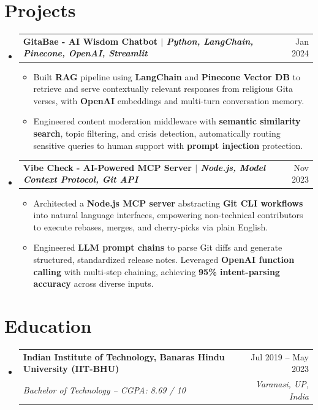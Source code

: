 \documentclass[a4paper,10pt]{article}
\makeatletter
\newcommand{\resumeItem}[1]{
  \item\small{
    {#1 \vspace{-1.8pt}}
  }
}
\newcommand{\resumeEducationEntry}[4]{
  \vspace{2pt}\item
    \begin{tabular*}{0.98\textwidth}[t]{l@{\extracolsep{\fill}}r}
      \textbf{#1} & \small #3 \\
      \textit{\small #2} & \textit{\small #4} \\
    \end{tabular*}\vspace{-4pt}
}
\newcommand{\resumeProjectHeading}[2]{
    \item
    \begin{tabular*}{0.98\textwidth}{l@{\extracolsep{\fill}}r}
      \small\textbf{#1} & \small #2 \\
    \end{tabular*}\vspace{-4pt}
}
\newcommand{\resumeSubHeadingListStart}{
  \begin{itemize}[leftmargin=0.15in, label={}, topsep=2pt, partopsep=0pt, itemsep=4pt, parsep=0pt]
}
\newcommand{\resumeSubHeadingListEnd}{\end{itemize}}
\newcommand{\resumeItemListStart}{\begin{itemize}[topsep=2pt, partopsep=0pt, itemsep=1.5pt, parsep=0pt]}
\newcommand{\resumeItemListEnd}{\end{itemize}\vspace{-2pt}}
\makeatother
\begin{document}
\section{Projects}
\resumeSubHeadingListStart
  \resumeProjectHeading{\textbf{GitaBae - AI Wisdom Chatbot} $|$ \textit{Python, LangChain, Pinecone, OpenAI, Streamlit}}{Jan 2024}
  \resumeItemListStart
    \resumeItem{Built \textbf{RAG} pipeline using \textbf{LangChain} and \textbf{Pinecone Vector DB} to retrieve and serve contextually relevant responses from religious Gita verses, with \textbf{OpenAI} embeddings and multi-turn conversation memory.}
    \resumeItem{Engineered content moderation middleware with \textbf{semantic similarity search}, topic filtering, and crisis detection, automatically routing sensitive queries to human support with \textbf{prompt injection} protection.}
  \resumeItemListEnd
  \resumeProjectHeading{\textbf{Vibe Check - AI-Powered MCP Server} $|$ \textit{Node.js, Model Context Protocol, Git API}}{Nov 2023}
  \resumeItemListStart
    \resumeItem{Architected a \textbf{Node.js MCP server} abstracting \textbf{Git CLI workflows} into natural language interfaces, empowering non-technical contributors to execute rebases, merges, and cherry-picks via plain English.}
    \resumeItem{Engineered \textbf{LLM prompt chains} to parse Git diffs and generate structured, standardized release notes. Leveraged \textbf{OpenAI function calling} with multi-step chaining, achieving \textbf{95\% intent-parsing accuracy} across diverse inputs.}
  \resumeItemListEnd
\resumeSubHeadingListEnd

\section{Education}
\resumeSubHeadingListStart
  \resumeEducationEntry
    {Indian Institute of Technology, Banaras Hindu University (IIT-BHU)}
    {Bachelor of Technology \textnormal{--} CGPA: 8.69 / 10}
    {Jul 2019 -- May 2023}
    {Varanasi, UP, India}
\resumeSubHeadingListEnd
\end{document}
